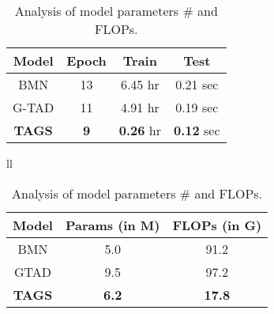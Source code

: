 \documentclass[runningheads]{llncs}
\newcommand{\shortmodelname}{TAGS}
\begin{document}
\begin{table}[t]
\begin{minipage}{.45\linewidth}
    \setlength{\tabcolsep}{5pt}
      \caption{Analysis of model training and test cost.}
      \centering
      \label{tab:speed}
        \begin{tabular}{c|c|c|c}
\toprule
        Model & Epoch & Train & Test
        \\ \midrule
        
        BMN & 13
        & 6.45 hr       & 0.21 sec            \\
        G-TAD & 11
        & 4.91 hr     & 0.19 sec         \\ 
        \midrule
        \textbf{{\shortmodelname}} & \bf 9
        & \textbf{0.26} hr & \textbf{0.12} sec \\ \bottomrule
        \end{tabular}
    \end{minipage}\hfill
    \begin{minipage}{.5\linewidth}
      \centering
      \setlength{\tabcolsep}{6pt}
        \caption{Analysis of model parameters \# and FLOPs.}
        \begin{tabular}{ll}
          \begin{tabular}{@{}c|c|c@{}}
\toprule
            Model & Params (in M) & FLOPs (in G)
                                                             \\ \midrule
            BMN                    & 5.0                            & 91.2                          \\
            GTAD                   & 9.5                            & 97.2                          \\ \hline
            \textbf{{\shortmodelname}}    & \textbf{6.2}                   & \textbf{17.8}                  \\ \bottomrule
            \end{tabular}
        \end{tabular}
        \label{tab:param}
    \end{minipage} 
\end{table}
\end{document}
